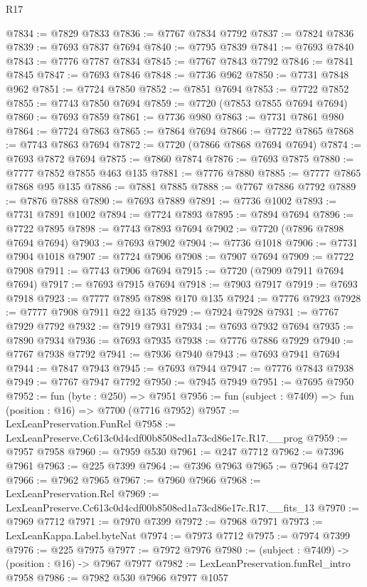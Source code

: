 \begin{lexlean}{R17}
\begin{coremodule}
@7834 := @7829 @7833
@7836 := @7767 @7834 @7792
@7837 := @7824 @7836
@7839 := @7693 @7837 @7694
@7840 := @7795 @7839
@7841 := @7693 @7840
@7843 := @7776 @7787 @7834
@7845 := @7767 @7843 @7792
@7846 := @7841 @7845
@7847 := @7693 @7846
@7848 := @7736 @962
@7850 := @7731 @7848 @962
@7851 := @7724 @7850
@7852 := @7851 @7694
@7853 := @7722 @7852
@7855 := @7743 @7850 @7694
@7859 := @7720 (@7853 @7855 @7694 @7694)
@7860 := @7693 @7859
@7861 := @7736 @980
@7863 := @7731 @7861 @980
@7864 := @7724 @7863
@7865 := @7864 @7694
@7866 := @7722 @7865
@7868 := @7743 @7863 @7694
@7872 := @7720 (@7866 @7868 @7694 @7694)
@7874 := @7693 @7872 @7694
@7875 := @7860 @7874
@7876 := @7693 @7875
@7880 := @7777 @7852 @7855 @463 @135
@7881 := @7776 @7880
@7885 := @7777 @7865 @7868 @95 @135
@7886 := @7881 @7885
@7888 := @7767 @7886 @7792
@7889 := @7876 @7888
@7890 := @7693 @7889
@7891 := @7736 @1002
@7893 := @7731 @7891 @1002
@7894 := @7724 @7893
@7895 := @7894 @7694
@7896 := @7722 @7895
@7898 := @7743 @7893 @7694
@7902 := @7720 (@7896 @7898 @7694 @7694)
@7903 := @7693 @7902
@7904 := @7736 @1018
@7906 := @7731 @7904 @1018
@7907 := @7724 @7906
@7908 := @7907 @7694
@7909 := @7722 @7908
@7911 := @7743 @7906 @7694
@7915 := @7720 (@7909 @7911 @7694 @7694)
@7917 := @7693 @7915 @7694
@7918 := @7903 @7917
@7919 := @7693 @7918
@7923 := @7777 @7895 @7898 @170 @135
@7924 := @7776 @7923
@7928 := @7777 @7908 @7911 @22 @135
@7929 := @7924 @7928
@7931 := @7767 @7929 @7792
@7932 := @7919 @7931
@7934 := @7693 @7932 @7694
@7935 := @7890 @7934
@7936 := @7693 @7935
@7938 := @7776 @7886 @7929
@7940 := @7767 @7938 @7792
@7941 := @7936 @7940
@7943 := @7693 @7941 @7694
@7944 := @7847 @7943
@7945 := @7693 @7944
@7947 := @7776 @7843 @7938
@7949 := @7767 @7947 @7792
@7950 := @7945 @7949
@7951 := @7695 @7950
@7952 := fun (byte : @250) => @7951
@7956 := fun (subject : @7409) => fun (position : @16) => @7700 (@7716 @7952)
@7957 := LexLeanPreservation.FunRel
@7958 := LexLeanPreserve.Cc613c0d4cdf00b8508ed1a73cd86e17c.R17.__prog
@7959 := @7957 @7958
@7960 := @7959 @530
@7961 := @247 @7712
@7962 := @7396 @7961
@7963 := @225 @7399
@7964 := @7396 @7963
@7965 := @7964 @7427
@7966 := @7962 @7965
@7967 := @7960 @7966
@7968 := LexLeanPreservation.Rel
@7969 := LexLeanPreserve.Cc613c0d4cdf00b8508ed1a73cd86e17c.R17.__fits_13
@7970 := @7969 @7712
@7971 := @7970 @7399
@7972 := @7968 @7971
@7973 := LexLeanKappa.Label.byteNat
@7974 := @7973 @7712
@7975 := @7974 @7399
@7976 := @225 @7975
@7977 := @7972 @7976
@7980 := (subject : @7409) -> (position : @16) -> @7967 @7977
@7982 := LexLeanPreservation.funRel_intro @7958
@7986 := @7982 @530 @7966 @7977 @1057

\end{coremodule}
\end{lexlean}
